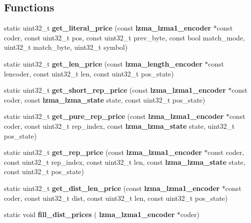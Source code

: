 \subsection*{Functions}
\begin{DoxyCompactItemize}
\item 
\mbox{\label{lzma__encoder__optimum__normal_8c_a6949c0d48a239f17d18ebcb826babf42}} 
static uint32\+\_\+t {\bfseries get\+\_\+literal\+\_\+price} (const \textbf{ lzma\+\_\+lzma1\+\_\+encoder} $\ast$const coder, const uint32\+\_\+t pos, const uint32\+\_\+t prev\+\_\+byte, const bool match\+\_\+mode, uint32\+\_\+t match\+\_\+byte, uint32\+\_\+t symbol)
\item 
\mbox{\label{lzma__encoder__optimum__normal_8c_ae75cbe3127b0374907614a13ac391806}} 
static uint32\+\_\+t {\bfseries get\+\_\+len\+\_\+price} (const \textbf{ lzma\+\_\+length\+\_\+encoder} $\ast$const lencoder, const uint32\+\_\+t len, const uint32\+\_\+t pos\+\_\+state)
\item 
\mbox{\label{lzma__encoder__optimum__normal_8c_af758d8b80ccdea7568c51f0f2e21d47a}} 
static uint32\+\_\+t {\bfseries get\+\_\+short\+\_\+rep\+\_\+price} (const \textbf{ lzma\+\_\+lzma1\+\_\+encoder} $\ast$const coder, const \textbf{ lzma\+\_\+lzma\+\_\+state} state, const uint32\+\_\+t pos\+\_\+state)
\item 
\mbox{\label{lzma__encoder__optimum__normal_8c_aac818e973efc34f84e1f79c97da1c5e3}} 
static uint32\+\_\+t {\bfseries get\+\_\+pure\+\_\+rep\+\_\+price} (const \textbf{ lzma\+\_\+lzma1\+\_\+encoder} $\ast$const coder, const uint32\+\_\+t rep\+\_\+index, const \textbf{ lzma\+\_\+lzma\+\_\+state} state, uint32\+\_\+t pos\+\_\+state)
\item 
\mbox{\label{lzma__encoder__optimum__normal_8c_ab6f0f0310b0680b4112baadd53a87a95}} 
static uint32\+\_\+t {\bfseries get\+\_\+rep\+\_\+price} (const \textbf{ lzma\+\_\+lzma1\+\_\+encoder} $\ast$const coder, const uint32\+\_\+t rep\+\_\+index, const uint32\+\_\+t len, const \textbf{ lzma\+\_\+lzma\+\_\+state} state, const uint32\+\_\+t pos\+\_\+state)
\item 
\mbox{\label{lzma__encoder__optimum__normal_8c_a6fbc169a50c9331a0740f0626420db65}} 
static uint32\+\_\+t {\bfseries get\+\_\+dist\+\_\+len\+\_\+price} (const \textbf{ lzma\+\_\+lzma1\+\_\+encoder} $\ast$const coder, const uint32\+\_\+t dist, const uint32\+\_\+t len, const uint32\+\_\+t pos\+\_\+state)
\item 
\mbox{\label{lzma__encoder__optimum__normal_8c_ab9203e21f43c21c5daf056443dafc5e5}} 
static void {\bfseries fill\+\_\+dist\+\_\+prices} (\textbf{ lzma\+\_\+lzma1\+\_\+encoder} $\ast$coder)

\end{DoxyCompactItemize}
